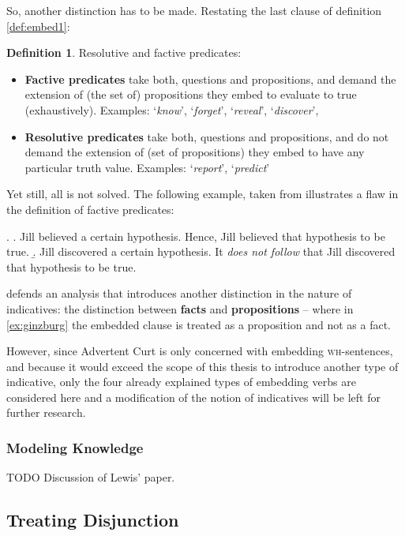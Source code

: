 \documentclass[a4paper]{article}
\newcommand{\term}[1]{\textsf{\textbf{#1}}} %
\newcommand{\pn}{\textsf} %
\newcommand{\example}[1]{`\textit{#1}'} %
\newcommand{\wh}{\textsc{wh}}
\newcommand{\acurt}{\pn{Advertent Curt}}
\theoremstyle{remark}
\theoremstyle{remark}
\theoremstyle{definition}
\newtheorem{definition}[thm]{Definition}
\theoremstyle{definition}
\begin{document}
So, another distinction has to be made. Restating the last clause of definition
\ref{def:embed1}:

\begin{definition}
  Resolutive and factive predicates:
  \begin{itemize}
  \item \term{Factive predicates} take both, questions and propositions, and
  demand the extension of (the set of) propositions they embed to evaluate to true (exhaustively).
  Examples:
  \example{know}, \example{forget}, \example{reveal}, \example{discover},
  \item \term{Resolutive predicates} take both, questions and propositions, and
  do not demand the extension of (set of propositions) they embed to have any particular truth value.
  Examples:
  \example{report}, \example{predict}
  \end{itemize}
\end{definition}

Yet still, all is not solved. The following example, taken from \cite[example
(27)]{ginzburg} illustrates a flaw in the definition of factive predicates:

\ex. \label{ex:ginzburg}
\a. Jill believed a certain hypothesis. Hence, Jill believed that hypothesis
to be true.
\b. Jill discovered a certain hypothesis. It \emph{does not follow} that Jill
discovered that hypothesis to be true. 

\cite{ginzburg} defends an analysis that
introduces another distinction in the nature of indicatives: the distinction
between \term{facts} and \term{propositions} -- where in \ref{ex:ginzburg} the
embedded clause is treated as a proposition and not as a fact.

However, since \acurt{} is only concerned with embedding \wh-sentences, and
because it would exceed the scope of this thesis to introduce another type of
indicative, only the four already explained types of embedding verbs are 
considered here and a modification of the notion of indicatives will be left for
further research.

\subsubsection{Modeling Knowledge}\label{sec:epistemic}

TODO Discussion of Lewis' paper.

\subsection{Treating Disjunction}
\end{document}
